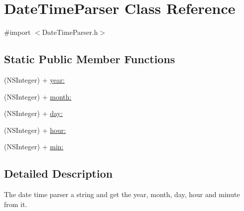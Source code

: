 \hypertarget{interface_date_time_parser}{\section{\-Date\-Time\-Parser \-Class \-Reference}
\label{interface_date_time_parser}
}


{\ttfamily \#import $<$\-Date\-Time\-Parser.\-h$>$}

\subsection*{\-Static \-Public \-Member \-Functions}
\begin{DoxyCompactItemize}
\item 
(\-N\-S\-Integer) + \hyperlink{interface_date_time_parser_a55231e1512eef70e1c551ca833326d75}{year\-:}
\item 
(\-N\-S\-Integer) + \hyperlink{interface_date_time_parser_af59822ee3b3334cd759b98a2cb9b776c}{month\-:}
\item 
(\-N\-S\-Integer) + \hyperlink{interface_date_time_parser_abb97d88f3b90f79e7479938a381b2f04}{day\-:}
\item 
(\-N\-S\-Integer) + \hyperlink{interface_date_time_parser_af7098a270403be453d8a197baacb7c46}{hour\-:}
\item 
(\-N\-S\-Integer) + \hyperlink{interface_date_time_parser_a62b5e9cf5b8112f93e72c8073a77a6b3}{min\-:}
\end{DoxyCompactItemize}


\subsection{\-Detailed \-Description}
\-The date time parser a string and get the year, month, day, hour and minute from it. 

